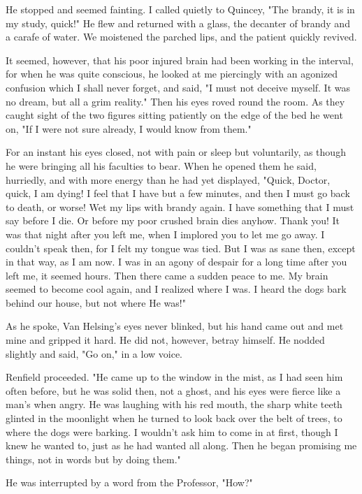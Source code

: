 He stopped and seemed fainting. I called quietly to Quincey, "The brandy, it is in my study, quick!" He flew and returned with a glass, the decanter of brandy and a carafe of water. We moistened the parched lips, and the patient quickly revived. 

It seemed, however, that his poor injured brain had been working in the interval, for when he was quite conscious, he looked at me piercingly with an agonized confusion which I shall never forget, and said, "I must not deceive myself. It was no dream, but all a grim reality." Then his eyes roved round the room. As they caught sight of the two figures sitting patiently on the edge of the bed he went on, "If I were not sure already, I would know from them." 

For an instant his eyes closed, not with pain or sleep but voluntarily, as though he were bringing all his faculties to bear. When he opened them he said, hurriedly, and with more energy than he had yet displayed, "Quick, Doctor, quick, I am dying! I feel that I have but a few minutes, and then I must go back to death, or worse! Wet my lips with brandy again. I have something that I must say before I die. Or before my poor crushed brain dies anyhow. Thank you! It was that night after you left me, when I implored you to let me go away. I couldn't speak then, for I felt my tongue was tied. But I was as sane then, except in that way, as I am now. I was in an agony of despair for a long time after you left me, it seemed hours. Then there came a sudden peace to me. My brain seemed to become cool again, and I realized where I was. I heard the dogs bark behind our house, but not where He was!" 

As he spoke, Van Helsing's eyes never blinked, but his hand came out and met mine and gripped it hard. He did not, however, betray himself. He nodded slightly and said, "Go on," in a low voice. 

Renfield proceeded. "He came up to the window in the mist, as I had seen him often before, but he was solid then, not a ghost, and his eyes were fierce like a man's when angry. He was laughing with his red mouth, the sharp white teeth glinted in the moonlight when he turned to look back over the belt of trees, to where the dogs were barking. I wouldn't ask him to come in at first, though I knew he wanted to, just as he had wanted all along. Then he began promising me things, not in words but by doing them." 

He was interrupted by a word from the Professor, "How?" 

